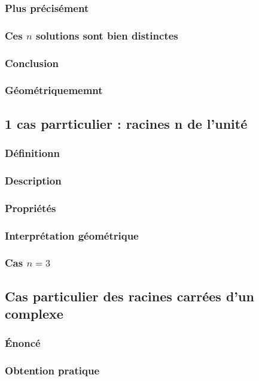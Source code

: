 \documentclass[12pt,a4paper,french]{book}
\begin{document}
			\subsubsection{Plus précisément}
			\subsubsection{Ces $n$ solutions sont bien distinctes}
			\subsubsection{Conclusion}
			\subsubsection{Géométriquememnt}
		\subsection{1 cas parrticulier : racines n de l'unité}
			\subsubsection{Définitionn}
			\subsubsection{Description}
			\subsubsection{Propriétés}
			\subsubsection{Interprétation géométrique}
			\subsubsection{Cas $n=3$}
		\subsection{Cas particulier des racines carrées d'un complexe}
			\subsubsection{Énoncé}
			\subsubsection{Obtention pratique}
\end{document}
